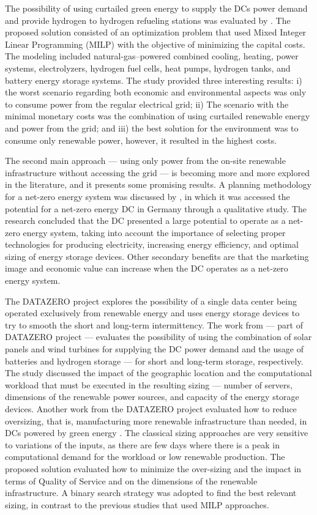 The possibility of using curtailed green energy to supply the DCs power demand and provide hydrogen to hydrogen refueling stations was evaluated by \citet{Niaz2022_curtailment}. The proposed solution consisted of an optimization problem that used Mixed Integer Linear Programming (MILP) with the objective of minimizing the capital costs.
The modeling included natural-gas–powered combined cooling, heating, power systems, electrolyzers, hydrogen fuel cells, heat pumps, hydrogen tanks, and battery energy storage systems. The study provided three interesting results: i) the worst scenario regarding both economic and environmental aspects was only to consume power from the regular electrical grid; ii) The scenario with the minimal monetary costs was the combination of using curtailed renewable energy and power from the grid; and iii) the best solution for the environment was to consume only renewable power, however, it resulted in the highest costs.


The second main approach --- using only power from the on-site renewable infrastructure without accessing the grid --- is becoming more and more explored in the literature, and it presents some promising results. A planning methodology for a net-zero energy system was discussed by \citet{Richter2021_netzero_dcs}, in which it was accessed the potential for a net-zero energy DC in Germany through a qualitative study. The research concluded that the DC presented a large potential to operate as a net-zero energy system, taking into account the importance of selecting proper technologies for producing electricity, increasing energy efficiency, and optimal sizing of energy storage devices. Other secondary benefits are that the marketing image and economic value can increase when the DC operates as a net-zero energy system. 


The DATAZERO \citep{datazero} project explores the possibility of a single data center being operated exclusively from renewable energy and uses energy storage devices to try to smooth the short and long-term intermittency. The work from \citet{HADDAD2021100505} --- part of DATAZERO project --- evaluates the possibility of using the combination of solar panels and wind turbines for supplying the DC power demand and the usage of batteries and hydrogen storage --- for short and long-term storage, respectively. The study discussed the impact of the geographic location and the computational workload that must be executed in the resulting sizing --- number of servers, dimensions of the renewable power sources, and capacity of the energy storage devices. Another work from the DATAZERO project evaluated how to reduce oversizing, that is, manufacturing more renewable infrastructure than needed, in DCs powered by green energy \citep{manal2022}. The classical sizing approaches are very sensitive to variations of the inputs, as there are few days where there is a peak in computational demand for the workload or low renewable production. The proposed solution evaluated how to minimize the over-sizing and the impact in terms of Quality of Service and on the dimensions of the renewable infrastructure. A binary search strategy was adopted to find the best relevant sizing, in contrast to the previous studies that used MILP approaches.



